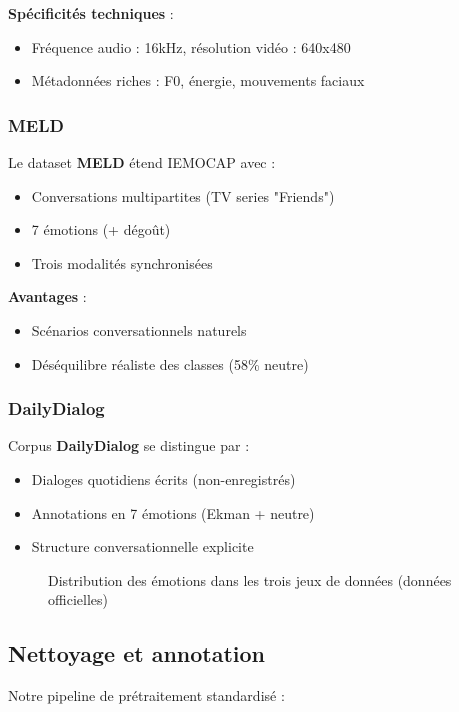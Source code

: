 \documentclass[a4paper,11pt]{article}
\begin{document}
\textbf{Spécificités techniques} :
\begin{itemize}
    \item Fréquence audio : 16kHz, résolution vidéo : 640x480
    \item Métadonnées riches : F0, énergie, mouvements faciaux
\end{itemize}

\subsubsection{MELD}
Le dataset \textbf{MELD} \cite{poria2019meld} étend IEMOCAP avec :
\begin{itemize}
    \item Conversations multipartites (TV series "Friends")
    \item 7 émotions (+ dégoût)
    \item Trois modalités synchronisées
\end{itemize}

\textbf{Avantages} :
\begin{itemize}
    \item Scénarios conversationnels naturels
    \item Déséquilibre réaliste des classes (58\% neutre)
\end{itemize}

\subsubsection{DailyDialog}
Corpus \textbf{DailyDialog} \cite{li2017dailydialog} se distingue par :
\begin{itemize}
    \item Dialoges quotidiens écrits (non-enregistrés)
    \item Annotations en 7 émotions (Ekman + neutre)
    \item Structure conversationnelle explicite
\end{itemize}

\begin{figure}[ht]
\centering
\caption{Distribution des émotions dans les trois jeux de données (données officielles)}
\label{fig:emo_dist}
\end{figure}

\subsection{Nettoyage et annotation}
Notre pipeline de prétraitement standardisé :
\end{document}

